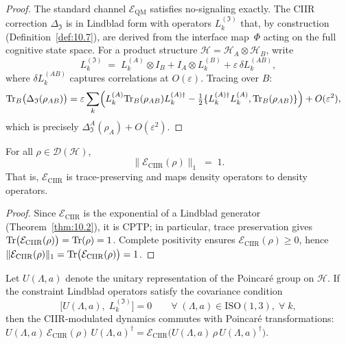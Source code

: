\begin{proof}
The standard channel $\mathcal{E}_{\mathrm{QM}}$ satisfies
no-signaling exactly.  The CIIR correction $\Delta_{\mathfrak{I}}$
is in Lindblad form with operators
$L_k^{(\mathfrak{I})}$ that, by construction
(Definition~\ref{def:10.7}), are derived from the interface map~$\Phi$
acting on the full cognitive state space.  For a product structure
$\mathcal{H}=\mathcal{H}_A\otimes\mathcal{H}_B$, write
\[
  L_k^{(\mathfrak{I})}
  \;=\;
  L_k^{(A)}\otimes I_B
  +
  I_A\otimes L_k^{(B)}
  +
  \varepsilon\,\delta L_k^{(AB)},
\]
where $\delta L_k^{(AB)}$ captures correlations at $O(\varepsilon)$.
Tracing over $B$:
\begin{align*}
  \mathrm{Tr}_B\bigl(\Delta_{\mathfrak{I}}(\rho_{AB})\bigr)
  &=
  \varepsilon\sum_k\Bigl(
    L_k^{(A)}\mathrm{Tr}_B(\rho_{AB})L_k^{(A)\dagger}
    -\tfrac{1}{2}\{L_k^{(A)\dagger}L_k^{(A)},\mathrm{Tr}_B(\rho_{AB})\}
  \Bigr)
  + O(\varepsilon^2),
\end{align*}
which is precisely $\Delta_{\mathfrak{I}}^A(\rho_A)+O(\varepsilon^2)$.
\end{proof}

\begin{theorem}
\label{thm:10.9}
For all $\rho\in\mathcal{D}(\mathcal{H})$,
\[
  \bigl\|\mathcal{E}_{\mathrm{CIIR}}(\rho)\bigr\|_1
  \;=\; 1.
\]
That is, $\mathcal{E}_{\mathrm{CIIR}}$ is trace-preserving and maps
density operators to density operators.
\end{theorem}

\begin{proof}
Since $\mathcal{E}_{\mathrm{CIIR}}$ is the exponential of a Lindblad
generator (Theorem~\ref{thm:10.2}), it is CPTP; in particular,
trace preservation gives
$\mathrm{Tr}\bigl(\mathcal{E}_{\mathrm{CIIR}}(\rho)\bigr)=\mathrm{Tr}(\rho)=1$.
Complete positivity ensures
$\mathcal{E}_{\mathrm{CIIR}}(\rho)\geq 0$, hence
$\|\mathcal{E}_{\mathrm{CIIR}}(\rho)\|_1
= \mathrm{Tr}\bigl(\mathcal{E}_{\mathrm{CIIR}}(\rho)\bigr) = 1$.
\end{proof}

\begin{proposition}
\label{prop:10.1}
Let $U(\Lambda,a)$ denote the unitary representation of the Poincar\'e
group on $\mathcal{H}$.  If the constraint Lindblad operators satisfy
the covariance condition
\begin{equation}
\label{eq:10.lorentz}
  \bigl[U(\Lambda,a),\; L_k^{(\mathfrak{I})}\bigr] = 0
  \qquad
  \forall\;(\Lambda,a)\in\mathrm{ISO}(1,3),\;\forall\;k,
\end{equation}
then the CIIR-modulated dynamics commutes with Poincar\'e
transformations:
$U(\Lambda,a)\,\mathcal{E}_{\mathrm{CIIR}}(\rho)\,U(\Lambda,a)^{\dagger}
= \mathcal{E}_{\mathrm{CIIR}}\bigl(U(\Lambda,a)\,\rho\,U(\Lambda,a)^{\dagger}\bigr)$.
\end{proposition}

